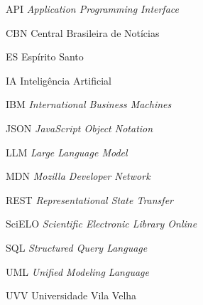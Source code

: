 \begin{siglas}
 \item API \textit{Application Programming Interface}
 \item CBN Central Brasileira de Notícias
 \item ES Espírito Santo
 \item IA Inteligência Artificial
 \item IBM \textit{International Business Machines}
 \item JSON \textit{JavaScript Object Notation}
 \item LLM \textit{Large Language Model}
 \item MDN \textit{Mozilla Developer Network}
 \item REST \textit{Representational State Transfer}
 \item SciELO \textit{Scientific Electronic Library Online}
 \item SQL \textit{Structured Query Language}
 \item UML \textit{Unified Modeling Language}
 \item UVV Universidade Vila Velha
\end{siglas}
